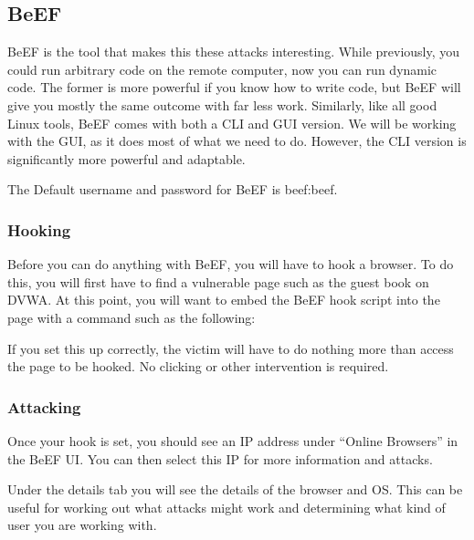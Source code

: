 		\subsection{BeEF}
			BeEF is the tool that makes this these attacks interesting. 	
			While previously, you could run arbitrary code on the remote computer, now you can run dynamic code. 
			The former is more powerful if you know how to write code, but BeEF will give you mostly the same outcome with far less work. 
			Similarly, like all good Linux tools, BeEF comes with both a CLI and GUI version. 
			We will be working with the GUI, as it does most of what we need to do. 
			However, the CLI version is significantly more powerful and adaptable. 
			
			The Default username and password for BeEF is beef:beef.
			\subsubsection{Hooking}
				Before you can do anything with BeEF, you will have to hook a browser. 
				To do this, you will first have to find a vulnerable page such as the guest book on DVWA. 
				At this point, you will want to embed the BeEF hook script into the page with a command such as the following:
				
				If you set this up correctly, the victim will have to do nothing more than access the page to be hooked. 
				No clicking or other intervention is required. 
			\subsubsection{Attacking}
				Once your hook is set, you should see an IP address under ``Online Browsers'' in the BeEF UI. 
				You can then select this IP for more information and attacks. 
				
				Under the details tab you will see the details of the browser and OS. 
				This can be useful for working out what attacks might work and determining what kind of user you are working with. 

